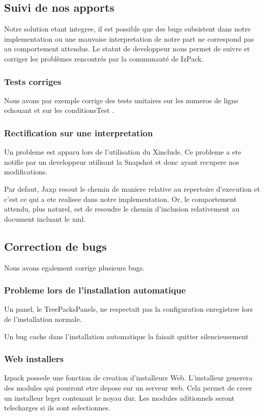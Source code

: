 \subsection{Suivi de nos apports}
Notre solution etant integree, il est possible que des bugs subsistent dans notre implementation ou une mauvaise interpretation de notre part ne correspond pas au comportement attendus. Le statut de developpeur nous permet de suivre et corriger les problèmes rencontrés par la communauté de IzPack.
\subsubsection{Tests corriges}
Nous avons par exemple corrige des tests unitaires sur les numeros de ligne echouant \cite{IZPACK-306} et sur les conditionsTest \cite{IZPACK-305}.
\subsubsection{Rectification sur une interpretation}
Un probleme est apparu lors de l'utilisation du Xinclude\cite{IZPACK-303}. Ce probleme a ete notifie par un developpeur utilisant la Snapshot et donc ayant recupere nos modifications.

Par defaut, Jaxp resout le chemin de maniere relative au repertoire d'execution et c'est ce qui a ete realisee dans notre implementation. Or, le comportement attendu, plus naturel, est de resoudre le chemin d'inclusion relativement au document incluant le xml.
\subsection{Correction de bugs}
Nous avons egalement corrige plusieurs bugs.
\subsubsection{Probleme lors de l'installation automatique}
Un panel, le TreePacksPanels, ne respectait pas la configuration enregistree lors de l'installation normale.\cite{IZPACK-223}

Un bug cache dans l'installation automatique la faisait quitter silencieusement \cite{IZPACK-309}
\subsubsection{Web installers}
Izpack possede une fonction de creation d'installeurs Web. L'installeur generera des modules qui pourront etre depose sur un serveur web. Cela permet de creer un installeur leger contenant le noyau dur. Les modules aditionnels seront telecharges si ils sont selectionnes.

